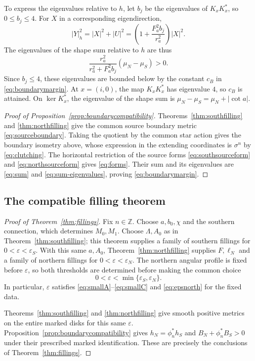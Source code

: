 \documentclass[12pt]{amsart}
\numberwithin{equation}{section}
\theoremstyle{remark}
\newcommand{\eps}{\varepsilon}
\begin{document}
To express the eigenvalues relative to \(h\), let \(b_j\) be the
eigenvalues of \(K_xK_x^*\), so \(0\le b_j\le4\).
For \(X\) in a corresponding eigendirection,
\[
|Y|_h^2=|X|^2+|U|^2
       =\left(1+\frac{F_a^2b_j}{r_a^2}\right)|X|^2.
\]
The eigenvalues of the shape sum relative to \(h\) are thus
\begin{equation}\label{eq:sum-eigenvalues}
\frac{r_a^2}{r_a^2+F_a^2b_j}(\mu_N-\mu_S)>0.
\end{equation}
Since \(b_j\le4\), these eigenvalues are bounded below by the
constant \(c_B\) in \eqref{eq:boundarymargin}. At
\(x=(i,0)\), the map \(K_xK_x^*\) has eigenvalue \(4\), so
\(c_B\) is attained. On \(\ker K_x^*\), the eigenvalue of the
shape sum is \(\mu_N-\mu_S=\mu_N+|\cot a|\).

\begin{proof}[Proof of Proposition~\ref{prop:boundarycompatibility}]
Theorems~\ref{thm:southfilling} and \ref{thm:northfilling} give the
common source boundary metric \eqref{eq:sourceboundary}. Taking the
quotient by the common star action gives the boundary isometry above,
whose expression in the extending coordinates is \(\sigma^n\) by
\eqref{eq:clutching}. The horizontal restriction of the source forms
\eqref{eq:southsourceform} and \eqref{eq:northsourceform} gives
\eqref{eq:forms}. Their sum and its eigenvalues are
\eqref{eq:sum} and \eqref{eq:sum-eigenvalues}, proving
\eqref{eq:boundarymargin}.
\end{proof}

\subsection{The compatible filling theorem}
\begin{proof}[Proof of Theorem~\ref{thm:fillings}]
Fix \(n\in\mathbb Z\). Choose \(a,b_0,\chi\) and the southern
connection, which determines \(M_0,M_1\). Choose \(\Lambda,A_0\)
as in Theorem~\ref{thm:southfilling}; this theorem supplies a
family of southern fillings for \(0<\eps<\eps_S\).
With this same \(a,A_0\), Theorem~\ref{thm:northfilling}
supplies \(F,\ell_N\) and a family of northern fillings for
\(0<\eps<\eps_N\). The northern angular profile is fixed before
\(\eps\), so both thresholds are determined before making the
common choice
\[
 0<\eps<\min\{\eps_S,\eps_N\}.
\]
In particular, \(\eps\) satisfies
\eqref{eq:smallA}--\eqref{eq:smallC} and \eqref{eq:epsnorth}
for the fixed data.

Theorems~\ref{thm:southfilling} and \ref{thm:northfilling} give
smooth positive metrics on the entire marked disks for this same
\(\eps\). Proposition~\ref{prop:boundarycompatibility} gives
\(h_N=\phi_n^*h_S\) and \(B_N+\phi_n^*B_S>0\) under their
prescribed marked identification. These are precisely the conclusions
of Theorem~\ref{thm:fillings}.
\end{proof}
\end{document}
